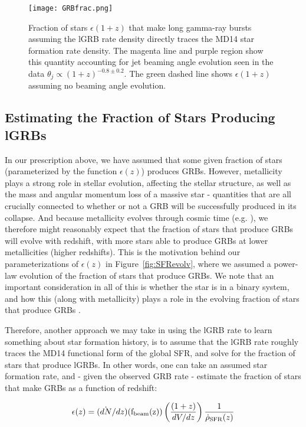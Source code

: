\documentclass[fleqn,usenatbib,useAMS]{mnras}
\begin{document}
\begin{figure}
    \centering
    \texttt{[image: GRBfrac.png]}
    \caption{Fraction of stars $\epsilon(1+z)$ that make long gamma-ray bursts assuming the lGRB rate density directly traces the MD14 star formation rate density.  The magenta line and purple region show this quantity accounting for jet beaming angle evolution seen in the data $\theta_{j} \propto (1+z)^{-0.8 \pm 0.2}$.  The green dashed line shows $\epsilon(1+z)$ assuming no beaming angle evolution.}
    \label{fig:GRBfrac}
\end{figure}


\subsection{Estimating the Fraction of Stars Producing lGRBs}
  In our prescription above, we have assumed that some given fraction of stars (parameterized by the function $\epsilon(z)$) produces GRBs.  However, metallicity plays a strong role in stellar evolution, affecting the stellar structure, as well as the mass and angular momentum loss of a massive star  - quantities that are all crucially connected to whether or not a GRB will be successfully produced in its collapse.  And because metallicity evolves through cosmic time (e.g. \cite{Pet97,LL09,Yuan13}), we therefore might reasonably expect that the fraction of stars that produce GRBs will evolve with redshift, with more stars able to produce GRBs at lower metallicities (higher redshifts).  This is the motivation behind our parameterizations of $\epsilon(z)$ in Figure~\ref{fig:SFRevolv}, where we assumed a power-law evolution of the fraction of stars that produce GRBs.  We note that an important consideration in all of this is whether the star is in a binary system, and how this (along with metallicity) plays a role in the evolving fraction of stars that produce GRBs \citep{MT20}. 
  
   Therefore, another approach we may take in using the lGRB rate to learn something about star formation history, is to assume that the lGRB rate roughly traces the MD14 functional form of the global SFR, and solve for the fraction of stars that produce lGRBs.  In other words, one can take an assumed star formation rate, and - given the observed GRB rate - estimate the fraction of stars that make GRBs as a function of redshift:
  
  \begin{equation}
     \epsilon(z) = (\dot{dN}/dz)({\rm f_{beam}(z)})  \left(\frac{(1+z)}{dV/dz} \right) \frac{1}{\dot{\rho}_{\rm SFR}(z)}
  \end{equation}  
  
\end{document}

